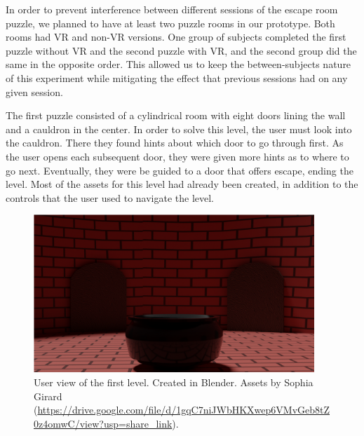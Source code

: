 \documentclass[manuscript,screen,review]{acmart}
\begin{document}
In order to prevent interference between different sessions of the escape room puzzle, we planned to have at least two puzzle rooms in our prototype. Both rooms had VR and non-VR versions. One group of subjects completed the first puzzle without VR and the second puzzle with VR, and the second group did the same in the opposite order. This allowed us to keep the between-subjects nature of this experiment while mitigating the effect that previous sessions had on any given session.

The first puzzle consisted of a cylindrical room with eight doors lining the wall and a cauldron in the center. In order to solve this level, the user must look into the cauldron. There they found hints about which door to go through first. As the user opens each subsequent door, they were given more hints as to where to go next. Eventually, they were be guided to a door that offers escape, ending the level. Most of the assets for this level had already been created, in addition to the controls that the user used to navigate the level.
\clearpage

\begin{figure}[h]
  \centering
  \includegraphics[width=300pt]{UserView.png}
  \caption{User view of the first level. Created in Blender. Assets by Sophia Girard (\url{https://drive.google.com/file/d/1gqC7niJWbHKXwep6VMvGeb8tZ0z4omwC/view?usp=share_link}).}
\end{figure}
\end{document}
